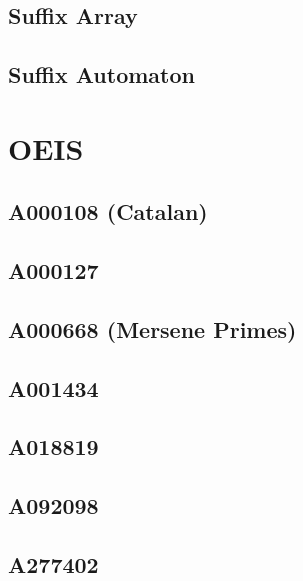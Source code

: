 \subsection{Suffix Array}

\subsection{Suffix Automaton}

\section{OEIS}
\subsection{A000108 (Catalan)}

\subsection{A000127}

\subsection{A000668 (Mersene Primes)}

\subsection{A001434}

\subsection{A018819}

\subsection{A092098}

\subsection{A277402}

